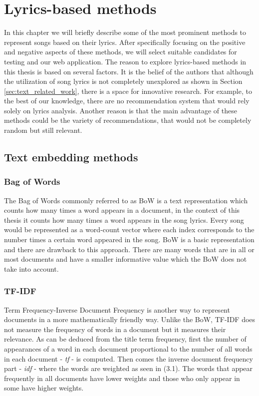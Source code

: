 \chapter{Lyrics-based methods}
 In this chapter we will briefly describe some of the most prominent methods to represent songs based on their lyrics. After specifically focusing on the positive and negative aspects of these methods, we will select suitable candidates for testing and our web application. The reason to explore lyrics-based methods in this thesis is based on several factors. It is the belief of the authors that although the utilization of song lyrics is not completely unexplored as shown in Section \ref{sec:text_related_work}, there is a space for innovative research. For example, to the best of our knowledge, there are no recommendation system that would rely solely on lyrics analysis. Another reason is that the main advantage of these methods could be the variety of recommendations, that would not be completely random but still relevant.

\section{Text embedding methods}
\subsection{Bag of Words}
The Bag of Words commonly referred to as BoW is a text representation which counts how many times a word appears in a document, in the context of this thesis it counts how many times a word appears in the song lyrics.
Every song would be represented as a word-count vector where each index corresponds to the number times a certain word appeared in the song. BoW is a basic representation and there are drawback to this approach. There are many words that are in all or most documents and have a smaller informative value which the BoW does not take into account.
\subsection{TF-IDF}
Term Frequency-Inverse Document Frequency is another way to represent documents in a more mathematically friendly way. Unlike the BoW, TF-IDF does not measure the frequency of words in a document but it measures their relevance. As can be deduced from the title term frequency, first the number of appearances of a word in each document proportional to the number of all words in each document - \textit{tf} - is computed. Then comes the inverse document frequency part - \textit{idf} - where the words are weighted as seen in (3.1). The words that appear frequently in all documents have lower weights and those who only appear in some have higher weights.

